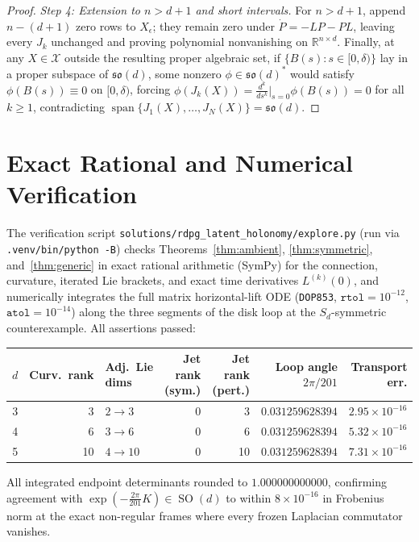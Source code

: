 \documentclass[11pt]{article}
\theoremstyle{plain}
\theoremstyle{definition}
\theoremstyle{remark}
\DeclareMathOperator{\SO}{SO}
\DeclareMathOperator{\spn}{span}
\begin{document}
\begin{proof}
\emph{Step 4: Extension to $n > d + 1$ and short intervals.}
For $n > d + 1$, append $n - (d+1)$ zero rows to $X_\epsilon$; they remain zero under $\dot{P} = -LP - PL$, leaving every $J_k$ unchanged and proving polynomial nonvanishing on $\mathbb{R}^{n \times d}$.
Finally, at any $X \in \mathcal{X}$ outside the resulting proper algebraic set, if $\{B(s) : s \in [0, \delta)\}$ lay in a proper subspace of $\mathfrak{so}(d)$, some nonzero $\phi \in \mathfrak{so}(d)^*$ would satisfy $\phi(B(s)) \equiv 0$ on $[0, \delta)$, forcing $\phi(J_k(X)) = \frac{d^k}{ds^k}\big|_{s=0}\phi(B(s)) = 0$ for all $k \ge 1$, contradicting $\spn\{J_1(X), \dots, J_N(X)\} = \mathfrak{so}(d)$.
\end{proof}

\section{Exact Rational and Numerical Verification}

The verification script \texttt{solutions/rdpg\_latent\_holonomy/explore.py} (run via \texttt{.venv/bin/python -B}) checks Theorems~\ref{thm:ambient}, \ref{thm:symmetric}, and~\ref{thm:generic} in exact rational arithmetic (SymPy) for the connection, curvature, iterated Lie brackets, and exact time derivatives $L^{(k)}(0)$, and numerically integrates the full matrix horizontal-lift ODE (\texttt{DOP853}, $\texttt{rtol}=10^{-12}$, $\texttt{atol}=10^{-14}$) along the three segments of the disk loop at the $S_d$-symmetric counterexample. All assertions passed:

\begin{table}[h!]
\centering
\small
\begin{tabular}{@{}rrlrrrr@{}}
\toprule
$d$ & Curv.\ rank & Adj.\ Lie dims & Jet rank (sym.) & Jet rank (pert.) & Loop angle $2\pi/201$ & Transport err. \\
\midrule
3 & 3  & $2 \to 3$  & 0 & 3  & $0.031259628394$ & $2.95 \times 10^{-16}$ \\
4 & 6  & $3 \to 6$  & 0 & 6  & $0.031259628394$ & $5.32 \times 10^{-16}$ \\
5 & 10 & $4 \to 10$ & 0 & 10 & $0.031259628394$ & $7.31 \times 10^{-16}$ \\
\bottomrule
\end{tabular}
\end{table}

All integrated endpoint determinants rounded to $1.000000000000$, confirming agreement with $\exp(-\frac{2\pi}{201}K) \in \SO(d)$ to within $8 \times 10^{-16}$ in Frobenius norm at the exact non-regular frames where every frozen Laplacian commutator vanishes.
\end{document}
